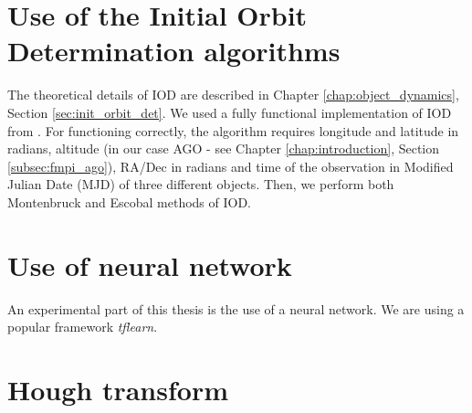 \section{Use of the Initial Orbit Determination algorithms}\label{sec:IDO}

	The theoretical details of IOD are described in Chapter \ref{chap:object_dynamics}, Section \ref{sec:init_orbit_det}. We used a fully functional implementation of IOD from \citep{Silha2012id}. For functioning correctly, the algorithm requires longitude and latitude in radians, altitude (in our case AGO - see Chapter \ref{chap:introduction}, Section \ref{subsec:fmpi_ago}), RA/Dec in radians and time of the observation in Modified Julian Date (MJD) of three different objects. Then, we perform both Montenbruck and Escobal methods of IOD.

\section{Use of neural network}\label{sec:neural}

	An experimental part of this thesis is the use of a neural network. We are using a popular framework \emph{tflearn}.

\section{Hough transform}\label{sec:hough}